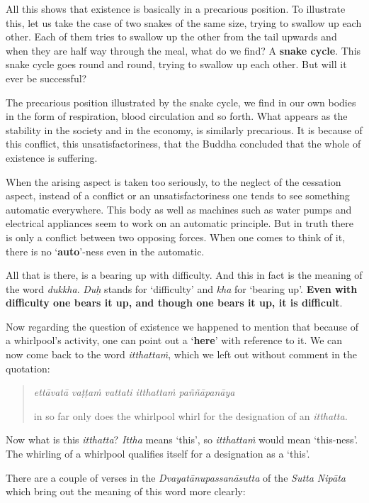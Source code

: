 All this shows that existence is basically in a precarious position. To illustrate this, let us take the case of two snakes of the same size, trying to swallow up each other. Each of them tries to swallow up the other from the tail upwards and when they are half way through the meal, what do we find? A \textbf{snake cycle}. This snake cycle goes round and round, trying to swallow up each other. But will it ever be successful?

The precarious position illustrated by the snake cycle, we find in our own bodies in the form of respiration, blood circulation and so forth. What appears as the stability in the society and in the economy, is similarly precarious. It is because of this conflict, this unsatisfactoriness, that the Buddha concluded that the whole of existence is suffering.

When the arising aspect is taken too seriously, to the neglect of the cessation aspect, instead of a conflict or an unsatisfactoriness one tends to see something automatic everywhere. This body as well as machines such as water pumps and electrical appliances seem to work on an automatic principle. But in truth there is only a conflict between two opposing forces. When one comes to think of it, there is no `\textbf{auto}'-ness even in the automatic.

All that is there, is a bearing up with difficulty. And this in fact is the meaning of the word \emph{dukkha}. \emph{Duḥ} stands for `difficulty' and \emph{kha} for `bearing up'. \textbf{Even with difficulty one bears it up, and though one bears it up, it is difficult}.

Now regarding the question of existence we happened to mention that because of a whirlpool's activity, one can point out a `\textbf{here}' with reference to it. We can now come back to the word \emph{itthattaṁ}, which we left out without comment in the quotation:

\begin{quote}
\emph{ettāvatā vaṭṭaṁ vattati itthattaṁ paññāpanāya}

in so far only does the whirlpool whirl for the designation of an \emph{itthatta.}
\end{quote}

Now what is this \emph{itthatta}? \emph{Ittha} means `this', so \emph{itthattaṁ} would mean `this-ness'. The whirling of a whirlpool qualifies itself for a designation as a `this'.

There are a couple of verses in the \emph{Dvayatānupassanāsutta} of the \emph{Sutta Nipāta} which bring out the meaning of this word more clearly:

